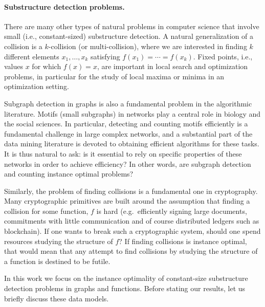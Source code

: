 \documentclass[11pt]{article}
\numberwithin{equation}{section}
\newcommand{\1}{\mathbf{1}}
\begin{document}
\paragraph{Substructure detection problems.}
There are many other types of natural problems in computer science that involve small (i.e., constant-sized) substructure detection. A natural generalization of a collision is a $k$-collision (or multi-collision), where we are interested in finding $k$ different elements $x_1, \ldots, x_k$ satisfying $f(x_1) = \cdots = f(x_k)$. Fixed points, i.e., values $x$ for which $f(x) = x$, are important in local search and optimization problems, in particular for the study of local maxima or minima in an optimization setting. 

Subgraph detection in graphs is also a fundamental problem in the algorithmic literature. Motifs (small subgraphs) in networks play a central role in biology and the social sciences. In particular, detecting and counting motifs 
efficiently is a fundamental challenge in large complex networks, and a substantial part of the data mining literature is devoted to obtaining efficient algorithms for these tasks. It is thus natural to ask: is it essential to rely on specific properties of these networks in order to achieve efficiency? In other words, are subgraph detection and counting instance optimal problems?

Similarly, the problem of finding collisions is a fundamental one in cryptography. Many cryptographic primitives are built around the assumption that finding a collision for some function, $f$ is hard (e.g.\ efficiently signing large documents, commitments with little communication and of course distributed ledgers such as  blockchain). If one wants to break such a cryptographic system, should one spend resources studying the structure of $f$? If finding collisions is instance optimal, that would mean that any attempt to find collisions by studying the structure of a function is destined to be futile.

In this work we focus on the instance optimality of constant-size substructure detection problems in graphs and functions. 
Before stating our results, let us briefly discuss these data models.
\end{document}
